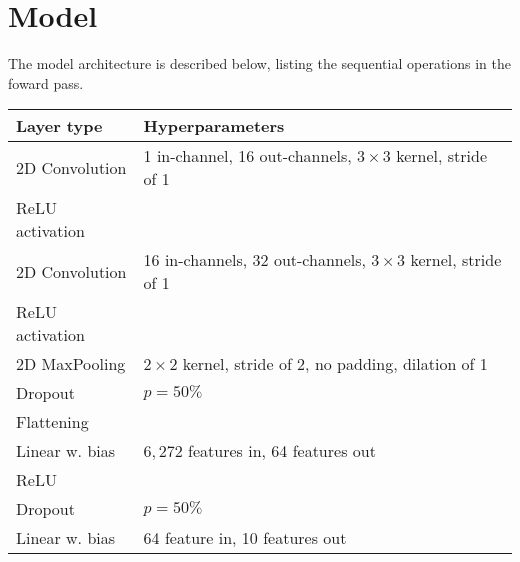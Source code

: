 \documentclass{article}
\begin{document}
\section{Model}
\label{app:model}
The model architecture is described below, listing the sequential operations in the foward pass.
\begin{table}[htb!]
    \centering
    \begin{tabular}{l|p{5cm}}
            Layer type & Hyperparameters\\
            \hline
            2D Convolution & 1 in-channel, 16 out-channels, $3\times 3$ kernel, stride of 1\\
            ReLU activation\\
            2D Convolution & 16 in-channels, 32 out-channels, $3\times 3$ kernel, stride of 1\\
            ReLU activation\\
            2D MaxPooling & $2\times 2$ kernel, stride of 2, no padding, dilation of 1\\
            Dropout & $p=50\%$\\
            Flattening\\
            Linear w. bias & $6,272$ features in, 64 features out\\
            ReLU \\
            Dropout & $p=50\%$\\
            Linear w. bias & 64 feature in, 10 features out
        \end{tabular}
\end{table}\noindent
\end{document}
